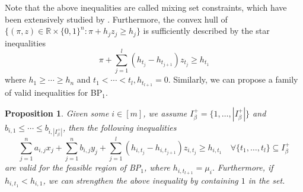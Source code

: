 \documentclass[11pt]{article}
\newtheorem{proposition}{Proposition}
\newcommand{\RR}{\mathbb{R}}
\begin{document}
Note that the above inequalities are called mixing set constraints, which have been extensively studied by \cite{gunluk2001mixing,atamturk2000mixed,luedtke2010integer,kuccukyavuz2012mixing,abdi2016mixing,zhao2017polyhedral}. Furthermore, the convex hull of $\{(\pi, z)\in \RR\times \{0,1\}^n: \pi + h_jz_j \geq h_j\}$ is sufficiently described by the star inequalities
\[ \pi + \sum_{j=1}^l (h_{t_j} - h_{t_{j+1}}) z_{t_j} \geq h_{t_1} \]
where $h_{1} \geq \cdots \geq h_n$ and $t_1 < \cdots < t_l, h_{t_{l+1}} = 0$. Similarly, we can propose a family of valid inequalities for BP$_1$. 
\begin{proposition}\label{thm:k_1_valid}
	Given some $i\in [m]$, we assume $I_\beta^+ = \{1, \ldots, |I_\beta^+|\}$ and $b_{i,1} \leq \cdots \leq b_{i,|I_\beta^+|}$, then the following inequalities
	\begin{equation}\label{eq:k_1_star}
		\sum_{j=1}^n a_{i,j} x_j + \sum_{j=1}^n b_{i,j} y_j  + \sum_{j=1}^{l} (h_{i,t_j} - h_{i,t_{j+1}}) z_{i,t_j} \geq h_{i, t_1} \quad \forall \{t_1, \ldots, t_l\} \subseteq I_\beta^+
	\end{equation}
	are valid for the feasible region of BP$_1$, where $h_{i,t_{l+1}} = \mu_i.$ Furthermore, if $h_{i, t_1} < h_{i, 1}$, we can strengthen the above inequality by containing $1$ in the set.
\end{proposition}
\end{document}
